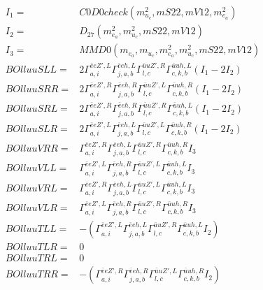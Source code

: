 \documentclass[A4,landscape]{article}
\begin{document}
\begin{align} 
I_1 = & C0D0check(m^2_{u_{{c}}}, mS22, mV12, m^2_{e_{{a}}}) \\ 
I_2 = & D_{27}(m^2_{e_{{a}}}, m^2_{u_{{c}}}, mS22, mV12) \\ 
I_3 = & MMD0(m_{e_{{a}}}, m_{u_{{c}}}, m^2_{e_{{a}}}, m^2_{u_{{c}}}, mS22, mV12) \\ 
  BOlluuSLL= & 2  \Gamma^{\bar{e}e {Z'} ,L}_{a, i} \Gamma^{\bar{e}e h ,L}_{j, a, b} \Gamma^{\bar{u}u {Z'} ,R}_{l, c} \Gamma^{\bar{u}u h ,L}_{c, k, b} (I_1 - 2 I_2) \\ 
  BOlluuSRR= & 2  \Gamma^{\bar{e}e {Z'} ,R}_{a, i} \Gamma^{\bar{e}e h ,R}_{j, a, b} \Gamma^{\bar{u}u {Z'} ,L}_{l, c} \Gamma^{\bar{u}u h ,R}_{c, k, b} (I_1 - 2 I_2) \\ 
  BOlluuSRL= & 2  \Gamma^{\bar{e}e {Z'} ,R}_{a, i} \Gamma^{\bar{e}e h ,R}_{j, a, b} \Gamma^{\bar{u}u {Z'} ,R}_{l, c} \Gamma^{\bar{u}u h ,L}_{c, k, b} (I_1 - 2 I_2) \\ 
  BOlluuSLR= & 2  \Gamma^{\bar{e}e {Z'} ,L}_{a, i} \Gamma^{\bar{e}e h ,L}_{j, a, b} \Gamma^{\bar{u}u {Z'} ,L}_{l, c} \Gamma^{\bar{u}u h ,R}_{c, k, b} (I_1 - 2 I_2) \\ 
  BOlluuVRR= &  \Gamma^{\bar{e}e {Z'} ,R}_{a, i} \Gamma^{\bar{e}e h ,L}_{j, a, b} \Gamma^{\bar{u}u {Z'} ,R}_{l, c} \Gamma^{\bar{u}u h ,R}_{c, k, b} I_3 \\ 
  BOlluuVLL= &  \Gamma^{\bar{e}e {Z'} ,L}_{a, i} \Gamma^{\bar{e}e h ,R}_{j, a, b} \Gamma^{\bar{u}u {Z'} ,L}_{l, c} \Gamma^{\bar{u}u h ,L}_{c, k, b} I_3 \\ 
  BOlluuVRL= &  \Gamma^{\bar{e}e {Z'} ,R}_{a, i} \Gamma^{\bar{e}e h ,L}_{j, a, b} \Gamma^{\bar{u}u {Z'} ,L}_{l, c} \Gamma^{\bar{u}u h ,L}_{c, k, b} I_3 \\ 
  BOlluuVLR= &  \Gamma^{\bar{e}e {Z'} ,L}_{a, i} \Gamma^{\bar{e}e h ,R}_{j, a, b} \Gamma^{\bar{u}u {Z'} ,R}_{l, c} \Gamma^{\bar{u}u h ,R}_{c, k, b} I_3 \\ 
  BOlluuTLL= & -( \Gamma^{\bar{e}e {Z'} ,L}_{a, i} \Gamma^{\bar{e}e h ,L}_{j, a, b} \Gamma^{\bar{u}u {Z'} ,R}_{l, c} \Gamma^{\bar{u}u h ,L}_{c, k, b} I_2) \\ 
  BOlluuTLR= & 0 \\ 
  BOlluuTRL= & 0 \\ 
  BOlluuTRR= & -( \Gamma^{\bar{e}e {Z'} ,R}_{a, i} \Gamma^{\bar{e}e h ,R}_{j, a, b} \Gamma^{\bar{u}u {Z'} ,L}_{l, c} \Gamma^{\bar{u}u h ,R}_{c, k, b} I_2) \\ 
\end{align} 
\end{document}
